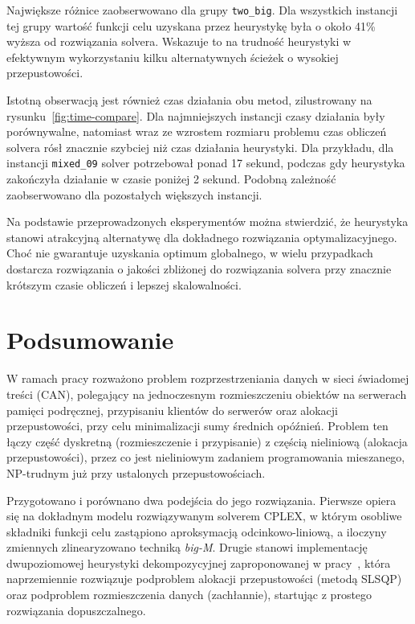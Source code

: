 \documentclass{article}
\begin{document}
Największe różnice zaobserwowano dla grupy \texttt{two\_big}. Dla wszystkich instancji tej grupy wartość funkcji celu uzyskana przez heurystykę była o około 41\% wyższa od rozwiązania solvera. Wskazuje to na trudność heurystyki w efektywnym wykorzystaniu kilku alternatywnych ścieżek o wysokiej przepustowości.

Istotną obserwacją jest również czas działania obu metod, zilustrowany na rysunku~\ref{fig:time-compare}. Dla najmniejszych instancji czasy działania były porównywalne, natomiast wraz ze wzrostem rozmiaru problemu czas obliczeń solvera rósł znacznie szybciej niż czas działania heurystyki. Dla przykładu, dla instancji \texttt{mixed\_09} solver potrzebował ponad 17 sekund, podczas gdy heurystyka zakończyła działanie w czasie poniżej 2 sekund. Podobną zależność zaobserwowano dla pozostałych większych instancji.

Na podstawie przeprowadzonych eksperymentów można stwierdzić, że heurystyka stanowi atrakcyjną alternatywę dla dokładnego rozwiązania optymalizacyjnego. Choć nie gwarantuje uzyskania optimum globalnego, w wielu przypadkach dostarcza rozwiązania o jakości zbliżonej do rozwiązania solvera przy znacznie krótszym czasie obliczeń i lepszej skalowalności.

\section{Podsumowanie}

W ramach pracy rozważono problem rozprzestrzeniania danych w sieci świadomej treści (CAN), polegający na jednoczesnym rozmieszczeniu obiektów na serwerach pamięci podręcznej, przypisaniu klientów do serwerów oraz alokacji przepustowości, przy celu minimalizacji sumy średnich opóźnień. Problem ten łączy część dyskretną (rozmieszczenie i przypisanie) z częścią nieliniową (alokacja przepustowości), przez co jest nieliniowym zadaniem programowania mieszanego, NP-trudnym już przy ustalonych przepustowościach.

Przygotowano i porównano dwa podejścia do jego rozwiązania. Pierwsze opiera się na dokładnym modelu rozwiązywanym solverem CPLEX, w którym osobliwe składniki funkcji celu zastąpiono aproksymacją odcinkowo-liniową, a iloczyny zmiennych zlinearyzowano techniką \emph{big-M}. Drugie stanowi implementację dwupoziomowej heurystyki dekompozycyjnej zaproponowanej w pracy~\cite{gasior2012}, która naprzemiennie rozwiązuje podproblem alokacji przepustowości (metodą SLSQP) oraz podproblem rozmieszczenia danych (zachłannie), startując z prostego rozwiązania dopuszczalnego.
\end{document}
